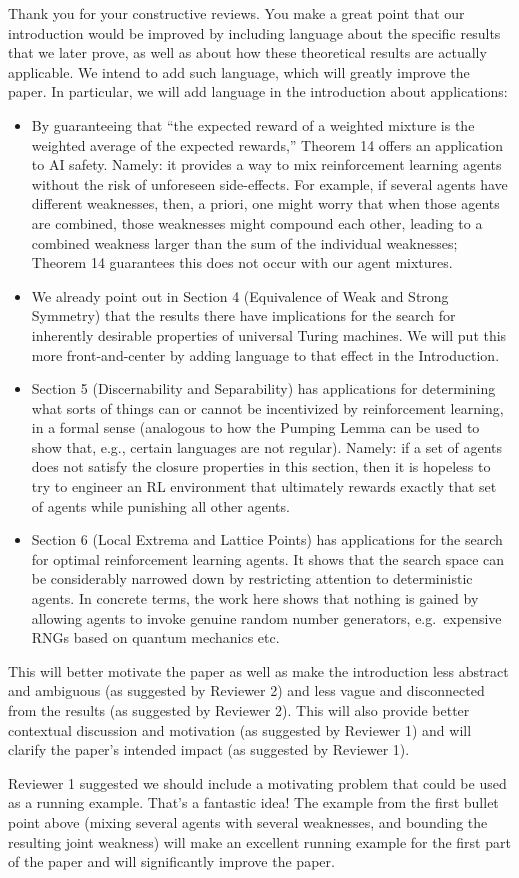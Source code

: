\documentclass{article}
\begin{document}
Thank you for your constructive reviews. You make a great point that our introduction would
be improved by including language about the specific results that we later prove, as well as
about how these theoretical results are actually applicable. We intend to add such
language, which will greatly improve the paper. In particular, we will add language in
the introduction about applications:
\begin{itemize}
    \item
    By guaranteeing that ``the expected reward of a weighted mixture is the weighted
    average of the expected rewards,'' Theorem 14 offers an application to AI safety.
    Namely: it provides a way to mix reinforcement learning agents without the risk of
    unforeseen side-effects. For example, if several agents have different weaknesses,
    then, a priori, one might worry that when those agents are combined, those weaknesses
    might compound each other, leading to a combined weakness larger than the sum of the
    individual weaknesses; Theorem 14
    guarantees this does not occur with our agent mixtures.
    \item
    We already point out in Section 4 (Equivalence of Weak and Strong Symmetry)
    that the results there
    have implications for the search for inherently desirable properties of universal Turing
    machines. We will put this more front-and-center by adding language to that effect in the
    Introduction.
    \item
    Section 5 (Discernability and Separability) has applications for determining what
    sorts of things can or cannot be incentivized by reinforcement learning, in a formal sense 
    (analogous to how the Pumping Lemma can be used to show that, e.g., certain
    languages are not regular). Namely: if a set of agents does not satisfy the
    closure properties in this
    section, then it is hopeless to try to engineer an RL environment that ultimately rewards
    exactly that set of agents while punishing all other agents.
    \item
    Section 6 (Local Extrema and Lattice Points) has applications for the search for
    optimal reinforcement learning agents. It shows that the search space can be
    considerably narrowed down by restricting attention to deterministic agents. In concrete
    terms, the work here shows that nothing is gained by allowing agents to invoke
    genuine random number generators, e.g.\ expensive RNGs based on quantum mechanics etc.
\end{itemize}
This will better motivate the paper as well as make the introduction less abstract and ambiguous (as suggested by Reviewer 2) and less vague and disconnected from the results (as suggested by Reviewer 2). This will also provide better contextual discussion and motivation (as suggested by Reviewer 1) and will clarify the paper's intended impact (as suggested by Reviewer 1).

Reviewer 1 suggested we should include a motivating problem that could be used as a running example. That's a fantastic idea! The example from the first bullet point above (mixing several agents with several weaknesses, and bounding the resulting joint weakness) will make an excellent running example for the first part of the paper and will significantly improve the paper.
\end{document}
